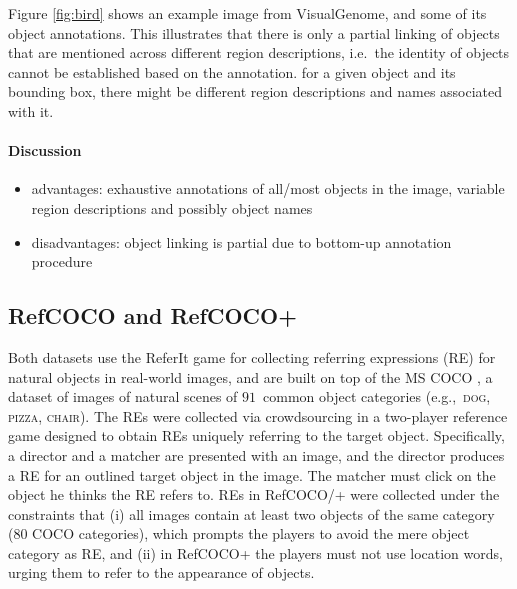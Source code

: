 \documentclass[10pt, a4paper]{article}
\newcommand{\cat}[1]{\textsc{#1}}
\newcommand{\referit}{ReferIt\xspace}
\newcommand{\refcoco}{RefCOCO\xspace}
\newcommand{\refcocop}{RefCOCO+\xspace}
\begin{document}
Figure \ref{fig:bird} shows an example image from VisualGenome, and some of its object annotations. This illustrates that there is only a partial linking of objects that are mentioned across different region descriptions, i.e.\ the identity of objects cannot be established based on the annotation. for a given object and its bounding box, there might be different region descriptions and names associated with it.

\paragraph{Discussion}
\begin{itemize}
\item advantages: exhaustive annotations of all/most objects in the image, variable region descriptions and possibly object names
\item disadvantages: object linking is partial due to bottom-up annotation procedure
\end{itemize}

\subsection{\refcoco and \refcocop}
Both datasets use the \referit\cite{Kazemzadeh2014} game for collecting referring expressions (RE) for natural objects in real-world images, and are built on top of the MS COCO \cite{mscoco}, 
a dataset of images of natural scenes of $91$~common object categories (e.g.,~\cat{dog, pizza, chair}). 
The REs were collected via crowdsourcing in a two-player reference game designed to obtain REs uniquely referring to the target object. 
Specifically, a director and a matcher are presented with an image, and the director produces a RE for an outlined target object in the image. 
The matcher must click on the object he thinks the RE refers to. %
REs in \refcoco/+ were collected under the constraints that (i) all images contain at least two objects of the same category (80 COCO categories), which prompts the players to avoid the mere object category as RE, and (ii) in \refcocop the players must not use location words, urging them to refer to the appearance of objects. 
\end{document}
